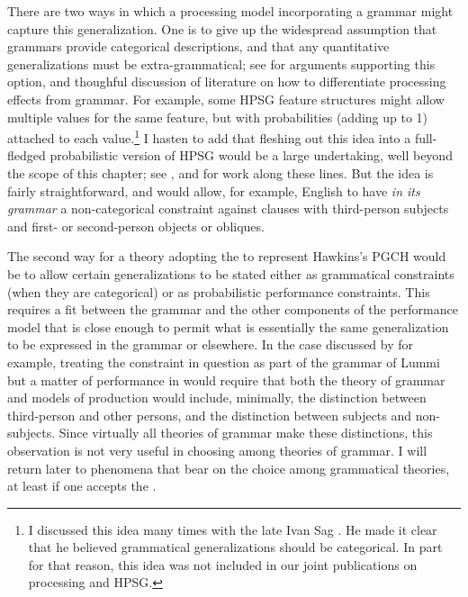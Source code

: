 \documentclass[a4paper]{article}
\begin{document}
There are two ways in which a processing model incorporating a grammar might capture this generalization.  One is to give up the widespread assumption that grammars provide categorical descriptions, and that any quantitative generalizations must be extra-grammatical; see \citet{FrancisPrep} for arguments supporting this option, and thoughful discussion of literature on how to differentiate processing effects from grammar.  For example, some HPSG feature structures might allow multiple values for the same feature, but with probabilities (adding up to 1) attached to each value.\footnote{I discussed this idea many times with the late Ivan Sag .  He made it clear that he believed grammatical generalizations should be categorical.  In part for that reason, this idea was not included in our joint publications on processing and HPSG.}  I hasten to add that fleshing out this idea into a full-fledged probabilistic version of HPSG would be a large undertaking, well beyond the scope of this chapter; see \citet{Linadarki2006}, and \citet{MT2008a-u} for work along these lines.  But the idea is fairly straightforward, and would allow, for example, English to have \emph{in its grammar} a non-categorical constraint against clauses with third-person subjects and first- or second-person objects or obliques.  

The second way for a theory adopting the  to represent Hawkins's PGCH would be to allow certain generalizations to be stated either as grammatical constraints (when they are categorical) or as probabilistic performance constraints.  This requires a fit between the grammar and the other components of the performance model that is close enough to permit what is essentially the same generalization to be expressed in the grammar or elsewhere.  In the case discussed by \citeauthor{BresnanEtAl2001} for example, treating the constraint in question as part of the grammar of Lummi but a matter of performance in  would require that both the theory of grammar and models of production would include, minimally, the distinction between third-person and other persons, and the distinction between subjects and non-subjects.  Since virtually all theories of grammar make these distinctions, this observation is not very useful in choosing among theories of grammar.  I will return later to phenomena that bear on the choice among grammatical theories, at least if one accepts the .
\end{document}
